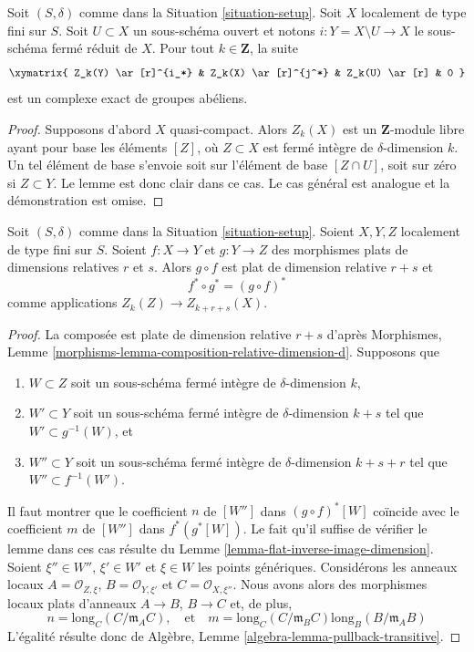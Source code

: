 \begin{lemma}
\label{lemma-exact-sequence-open}
Soit $(S, \delta)$ comme dans la Situation \ref{situation-setup}.
Soit $X$ localement de type fini sur $S$.
Soit $U \subset X$ un sous-schéma ouvert et notons
$i : Y = X \setminus U \to X$ le sous-schéma fermé réduit de $X$.
Pour tout $k \in \mathbf{Z}$, la suite
$$
\xymatrix{
Z_k(Y) \ar[r]^{i_*} & Z_k(X) \ar[r]^{j^*} & Z_k(U) \ar[r] & 0
}
$$
est un complexe exact de groupes abéliens.
\end{lemma}

\begin{proof}
Supposons d'abord $X$ quasi-compact. Alors $Z_k(X)$ est un $\mathbf{Z}$-module libre
ayant pour base les éléments $[Z]$, où $Z \subset X$ est fermé intègre
de $\delta$-dimension $k$. Un tel élément de base s'envoie
soit sur l'élément de base $[Z \cap U]$, soit sur zéro si $Z \subset Y$.
Le lemme est donc clair dans ce cas. Le cas général est analogue
et la démonstration est omise.
\end{proof}

\begin{lemma}
\label{lemma-compose-flat-pullback}
Soit $(S, \delta)$ comme dans la Situation \ref{situation-setup}.
Soient $X, Y, Z$ localement de type fini sur $S$.
Soient $f : X \to Y$ et $g : Y \to Z$ des morphismes plats de dimensions relatives
$r$ et $s$. Alors $g \circ f$ est plat de dimension relative
$r + s$ et
$$
f^* \circ g^* = (g \circ f)^*
$$
comme applications $Z_k(Z) \to Z_{k + r + s}(X)$.
\end{lemma}

\begin{proof}
La composée est plate de dimension relative $r + s$ d'après
Morphismes, Lemme \ref{morphisms-lemma-composition-relative-dimension-d}.
Supposons que
\begin{enumerate}
\item $W \subset Z$ soit un sous-schéma fermé intègre de $\delta$-dimension $k$,
\item $W' \subset Y$ soit un sous-schéma fermé intègre de $\delta$-dimension
$k + s$ tel que $W' \subset g^{-1}(W)$, et
\item $W'' \subset Y$ soit un sous-schéma fermé intègre de $\delta$-dimension
$k + s + r$ tel que $W'' \subset f^{-1}(W')$.
\end{enumerate}
Il faut montrer que le coefficient $n$ de $[W'']$ dans
$(g \circ f)^*[W]$ coïncide avec le coefficient $m$ de
$[W'']$ dans $f^*(g^*[W])$. Le fait qu'il suffise de vérifier le lemme dans ces
cas résulte du Lemme \ref{lemma-flat-inverse-image-dimension}.
Soient $\xi'' \in W''$, $\xi' \in W'$
et $\xi \in W$ les points génériques. Considérons les anneaux locaux
$A = \mathcal{O}_{Z, \xi}$, $B = \mathcal{O}_{Y, \xi'}$
et $C = \mathcal{O}_{X, \xi''}$. Nous avons alors des morphismes locaux plats d'anneaux
$A \to B$, $B \to C$ et, de plus,
$$
n = \text{long}_C(C/\mathfrak m_AC),
\quad
\text{et}
\quad
m = \text{long}_C(C/\mathfrak m_BC) \text{long}_B(B/\mathfrak m_AB)
$$
L'égalité résulte donc de
Algèbre, Lemme \ref{algebra-lemma-pullback-transitive}.
\end{proof}

